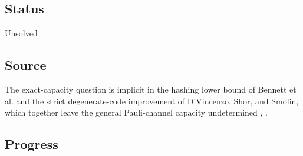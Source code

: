 \subsection*{Status}

Unsolved

\subsection*{Source}

The exact-capacity question is implicit in the hashing lower bound of Bennett
et al. and the strict degenerate-code improvement of DiVincenzo, Shor, and
Smolin, which together leave the general Pauli-channel capacity undetermined
,
.

\subsection*{Progress}

